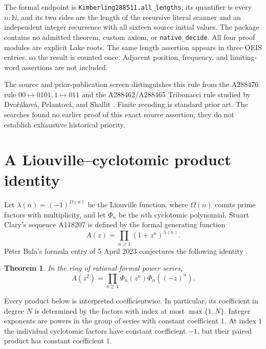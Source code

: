 \documentclass[11pt]{article}
\newtheorem{theorem}{Theorem}[section]
\begin{document}
The formal endpoint is
\texttt{Kimberling288511.all\_lengths}; its quantifier is every $n:\mathbb N$,
and its two sides are the length of the recursive literal scanner and
an independent integer recurrence with all sixteen source initial values.
The package contains no admitted theorem, custom axiom, or
\texttt{native\_decide}. All four proof modules are explicit Lake roots.
The same length assertion appears in three OEIS entries, so the result
is counted once. Adjacent position, frequency, and limiting-word
assertions are not included.

The source and prior-publication screen distinguishes this rule from
the A288476 rule $00\mapsto0101,1\mapsto011$ and the
A288462/A288465 Tribonacci rule studied by Dvo\v r\'akov\'a,
Pelantov\'a, and Shallit \cite{DPS2026}. Finite recoding is standard prior art.
The searches found no earlier proof of this exact source assertion;
they do not establish exhaustive historical priority.

\section{A Liouville--cyclotomic product identity}\label{sec:liouville}

Let $\lambda(n)=(-1)^{\Omega(n)}$ be the Liouville function, where
$\Omega(n)$ counts prime factors with multiplicity, and let $\Phi_n$ be
the $n$th cyclotomic polynomial. Stuart Clary's sequence A118207 is defined by
the formal generating function
\begin{equation}\label{eq:liouville-A}
 A(z)=\prod_{n\ge1}(1+z^n)^{\lambda(n)}.
\end{equation}
Peter Bala's formula entry of 5 April 2023 conjectures the following
identity \cite{oeis118207}.

\begin{theorem}\label{thm:liouville-main}
In the ring of rational formal power series,
\begin{equation}\label{eq:liouville-target}
 A(z^2)=\prod_{n\ge1}\Phi_n(z^n)\Phi_n((-z)^n).
\end{equation}
\end{theorem}

Every product below is interpreted coefficientwise. In particular, its
coefficient in degree $N$ is determined by the factors with index at most
$\max\{1,N\}$. Integer exponents are powers in the group of series with constant
coefficient $1$. At index $1$ the individual cyclotomic factors have
constant coefficient $-1$, but their paired product has constant
coefficient $1$.
\end{document}
